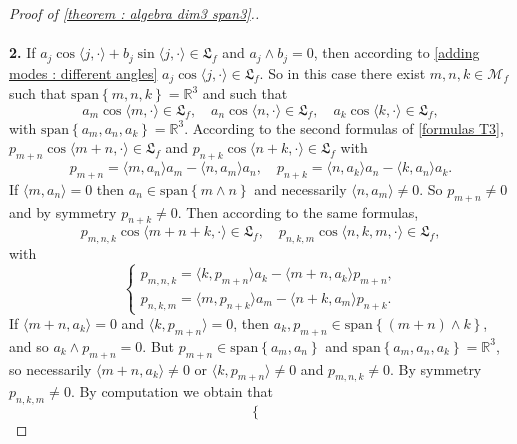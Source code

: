 \documentclass[10pt]{article}
\newcommand{\R}{{\mathbb R}}
\newcommand{\M}{{\mathcal M}}
\newcommand{\la}{\langle}
\newcommand{\ra}{\rangle}
\newcommand{\we}{\wedge}
\begin{document}
\begin{proof}[Proof of \cref{theorem : algebra dim3 span3}.]
    \\ \\
    \textbf{2.} If $a_j \cos \la j,\cdot \ra +b_j \sin \la j,\cdot \ra \in \mathfrak{L}_f$ and $a_j \we b_j=0$, then according to \cref{adding modes : different angles} $a_j \cos \la j,\cdot \ra \in \mathfrak{L}_f$. So in this case there exist $m,n,k\in \M_f$ such that $\mathrm{span} \left\{m,n,k\right\}=\R^3$ and such that
    \begin{equation*}
        a_m \cos \la m,\cdot \ra \in \mathfrak{L}_f, \quad a_n \cos \la n,\cdot \ra \in \mathfrak{L}_f, \quad a_k \cos \la k,\cdot \ra \in \mathfrak{L}_f,   
    \end{equation*}
    with $\mathrm{span} \left\{a_m,a_n,a_k\right\}=\R^3$. According to the second formulas of \cref{formulas T3}, $p_{m+n}\cos \la m+n,\cdot \ra\in \mathfrak{L}_f$ and $p_{n+k}\cos \la n+k,\cdot \ra \in \mathfrak{L}_f$ with 
    \begin{equation*}
        p_{m+n}= \la m,a_n \ra a_m - \la n,a_m \ra a_n, \quad p_{n+k}=\la n,a_k \ra a_n - \la k,a_n \ra a_k.
    \end{equation*}
    If $\la m,a_n\ra =0$ then $a_n \in \mathrm{span} \left\{ m\we n \right\}$ and necessarily $\la n,a_m\ra \neq 0$. So $p_{m+n}\neq 0$ and by symmetry $p_{n+k}\neq 0$.
    Then according to the same formulas, 
    \begin{equation*}
        p_{m,n,k}\cos \la m+n+k,\cdot \ra \in \mathfrak{L}_f, \quad p_{n,k,m}\cos \la n,k,m, \cdot \ra \in \mathfrak{L}_f,
    \end{equation*}
    with
    \begin{equation*}
        \left\{\begin{array}{ll}
             p_{m,n,k}=\la k,p_{m+n}\ra a_k -\la m+n,a_k \ra p_{m+n},  \\
             p_{n,k,m}=\la m,p_{n+k} \ra a_m - \la n+k,a_m\ra p_{n+k}.
        \end{array}\right.
    \end{equation*}
    If $\la m+n ,a_k \ra=0$ and $\la k,p_{m+n}\ra=0$, then $a_k,p_{m+n}\in \mathrm{span} \left\{(m+n)\we k\right\}$, and so $a_k \we p_{m+n}=0$. But $p_{m+n}\in \mathrm{span} \left\{a_m,a_n\right\}$ and $\mathrm{span} \left\{a_m,a_n,a_k\right\}=\R^3$, so necessarily $\la m+n,a_k \ra \neq 0$ or $\la k,p_{m+n}\ra \neq 0$ and $p_{m,n,k}\neq 0$. By symmetry $p_{n,k,m}\neq 0$. By computation we obtain that 
    \begin{equation*}
        \left\{\begin{array}{ll}

\end{array}
\end{equation*}
\end{proof}
\end{document}
